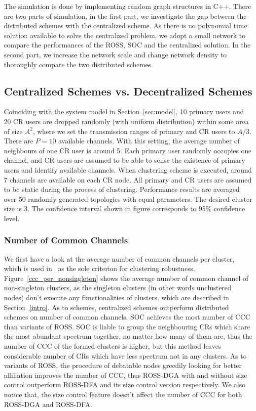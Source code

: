 The simulation is done by implementing random graph structures in C++. 
There are two parts of simulation, in the first part, we investigate the gap between the distributed schemes with the centralized scheme.
As there is no polynomial time solution available to solve the centralized problem, we adopt a small network to compare the performances of the ROSS, SOC and the centralized solution.
In the second part, we increase the network scale and change network density to thoroughly compare the two distributed schemes.
\subsection{Centralized Schemes vs. Decentralized Schemes}
Coinciding with the system model in Section~\ref{sec:model}, 10 primary users and 20 CR users are dropped randomly (with uniform distribution) within some area of size $A^{2}$, where we set the transmission ranges of primary and CR users to $A/3$. There are $P=10$ available channels. 
With this setting, the average number of neighbours of one CR user is around 5.
Each primary user randomly occupies one channel, and CR users are assumed to be able to sense the existence of primary users and identify available channels.
When clustering scheme is executed, around 7 channels are available on each CR node.
All primary and CR users are assumed to be static during the process of clustering.
Performance results are averaged over 50 randomly generated topologies with equal parameters.
The desired cluster size is 3.
The confidence interval shown in figure corresponds to 95\% confidence level.

\subsubsection{Number of Common Channels}
\label{ccc_20}
We first have a look at the average number of common channels per cluster, which is used in~\cite{LIU_TMC11_2} as the sole criterion for clustering robustness.
Figure~\ref{ccc_per_nonsingleton} shows the average number of common channel of non-singleton clusters, as the singleton clusters (in other words unclustered nodes) don't execute any functionalities of clusters, which are described in Section~\ref{intro}.
As to schemes, centralized schemes outperform distributed schemes on number of common channels.
SOC achieves the most number of CCC than variants of ROSS.
SOC is liable to group the neighbouring CRs which share the most abundant spectrum together, no matter how many of them are, thus the number of CCC of the formed clusters is higher, but this method leaves considerable number of CRs which have less spectrum not in any clusters.
As to variants of ROSS, the procedure of debatable nodes greedily looking for better affiliation improves the number of CCC, thus ROSS-DGA with and without size control outperform ROSS-DFA and its size control version respectively.
We also notice that, the size control feature doesn't affect the number of CCC for both ROSS-DGA and ROSS-DFA.


